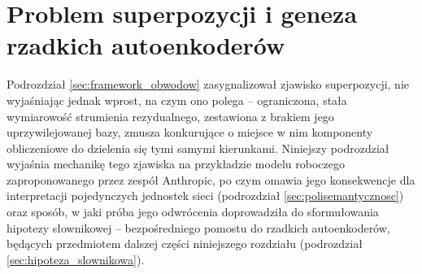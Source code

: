 \section{Problem superpozycji i geneza rzadkich autoenkoderów}
\label{sec:superpozycja}
Podrozdział \ref{sec:framework_obwodow} zasygnalizował zjawisko superpozycji, nie wyjaśniając jednak wprost, na czym ono polega -- ograniczona, stała wymiarowość strumienia rezydualnego, zestawiona z brakiem jego uprzywilejowanej bazy, zmusza konkurujące o miejsce w nim komponenty obliczeniowe do dzielenia się tymi samymi kierunkami. Niniejszy podrozdział wyjaśnia mechanikę tego zjawiska na przykładzie modelu roboczego zaproponowanego przez zespół Anthropic, po czym omawia jego konsekwencje dla interpretacji pojedynczych jednostek sieci (podrozdział \ref{sec:polisemantycznosc}) oraz sposób, w jaki próba jego odwrócenia doprowadziła do sformułowania hipotezy słownikowej -- bezpośredniego pomostu do rzadkich autoenkoderów, będących przedmiotem dalszej części niniejszego rozdziału (podrozdział \ref{sec:hipoteza_slownikowa}).
